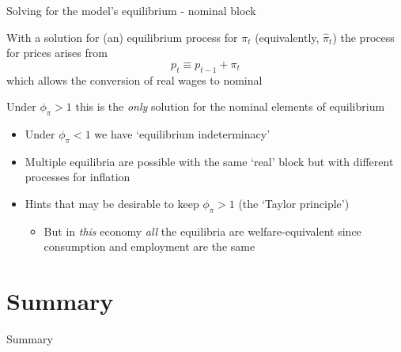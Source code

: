 

\begin{frame}{Solving for the model's equilibrium - nominal block}

With a solution for (an) equilibrium process for $\pi_{t}$ (equivalently, $\hat{\pi}_{t}$) the process for prices arises from
\[
p_{t} \equiv p_{t-1} + \pi_{t}
\]
which allows the conversion of real wages to nominal

\vspace{2mm}
Under $\phi_{\pi}>1$ this is the \emph{only} solution for the nominal elements of equilibrium
\begin{itemize}
\item	Under $\phi_{\pi}<1$ we have `equilibrium indeterminacy'
\item	Multiple equilibria are possible with the same `real' block but with different processes for inflation
\item	Hints that may be desirable to keep $\phi_{\pi}>1$ (the `Taylor principle')
	\begin{itemize}
	\item	But in \emph{this} economy \emph{all} the equilibria are welfare-equivalent since consumption and employment are the same
	\end{itemize}
\end{itemize}

\end{frame}

\section{Summary}

\begin{frame}

\begin{center}
{\LARGE Summary}
\end{center}

\end{frame}




